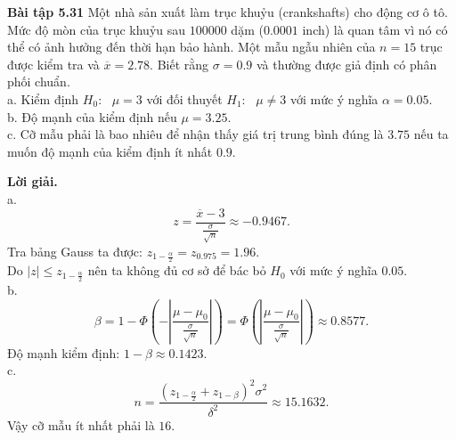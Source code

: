 \begin{mybox}
\textbf{Bài tập 5.31} Một nhà sản xuất làm trục khuỷu (crankshafts) cho động cơ ô tô. Mức độ mòn của trục khuỷu sau $100000$ dặm ($0.0001$ inch) là quan tâm vì nó có thể có ảnh hưởng đến thời hạn bảo hành. Một mẫu ngẫu nhiên của $n = 15$ trục được kiểm tra và $\overline{x} = 2.78.$ Biết rằng $\sigma = 0.9$ và thường được giả định có phân phối chuẩn.\\
a. Kiểm định $H_0: \text{ } \mu = 3$ với đối thuyết $H_1: \text{ } \mu \ne 3$ với mức ý nghĩa $\alpha = 0.05.$\\
b. Độ mạnh của kiểm định nếu $\mu = 3.25.$\\
c. Cỡ mẫu phải là bao nhiêu để nhận thấy giá trị trung bình đúng là $3.75$ nếu ta muốn độ mạnh của kiểm định ít nhất $0.9.$
\end{mybox}
\textbf{Lời giải.}\\
a. $$z = \frac{\overline{x} - 3}{\frac{\sigma}{\sqrt{n}}} \approx -0.9467 .$$
Tra bảng Gauss ta được: $z_{1 - \frac{\alpha}{2}}  = z_{0.975} = 1.96.$\\
Do $\left| z \right| \leqslant z_{1 - \frac{\alpha}{2}}$ nên ta không đủ cơ sở để bác bỏ $H_0$ với mức ý nghĩa $0.05.$\\
b. $$\beta  = 1 - \Phi \left( { - \left| {\frac{{\mu  - {\mu _0}}}{{\frac{\sigma }{{\sqrt n }}}}} \right|} \right) = \Phi \left( {\left| {\frac{{\mu  - {\mu _0}}}{{\frac{\sigma }{{\sqrt n }}}}} \right|} \right) \approx 0.8577.$$
Độ mạnh kiểm định: $1 - \beta \approx 0.1423.$\\
c. $$n = \frac{{{{\left( {{z_{1 - \frac{\alpha }{2}}} + {z_{1 - \beta }}} \right)}^2}{\sigma ^2}}}{{{\delta ^2}}} \approx 15.1632.$$
Vậy cỡ mẫu ít nhất phải là $16.$

